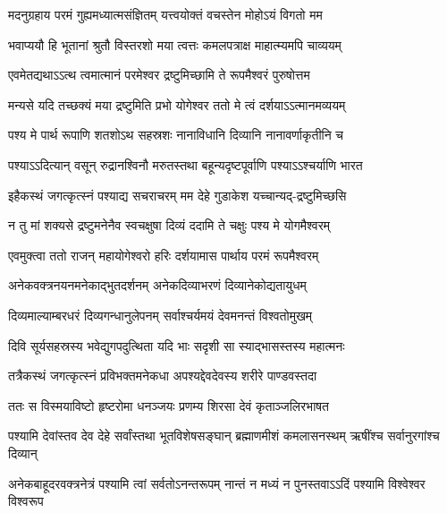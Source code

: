 \twolineshloka
{मदनुग्रहाय परमं गुह्यमध्यात्मसंज्ञितम्}
{यत्त्वयोक्तं वचस्तेन मोहोऽयं विगतो मम}%

\twolineshloka
{भवाप्ययौ हि भूतानां श्रुतौ विस्तरशो मया}
{त्वत्तः कमलपत्राक्ष माहात्म्यमपि चाव्ययम्}%

\twolineshloka
{एवमेतद्यथाऽऽत्थ त्वमात्मानं परमेश्वर}
{द्रष्टुमिच्छामि ते रूपमैश्वरं पुरुषोत्तम}%

\twolineshloka
{मन्यसे यदि तच्छक्यं मया द्रष्टुमिति प्रभो}
{योगेश्वर ततो मे त्वं दर्शयाऽऽत्मानमव्ययम्}%

\twolineshloka
{पश्य मे पार्थ रूपाणि शतशोऽथ सहस्रशः}
{नानाविधानि दिव्यानि नानावर्णाकृतीनि च}%

\twolineshloka
{पश्याऽऽदित्यान् वसून् रुद्रानश्विनौ मरुतस्तथा}
{बहून्यदृष्टपूर्वाणि पश्याऽऽश्चर्याणि भारत}%

\twolineshloka
{इहैकस्थं जगत्कृत्स्नं पश्याद्य सचराचरम्}
{मम देहे गुडाकेश यच्चान्यद्-द्रष्टुमिच्छसि}%

\twolineshloka
{न तु मां शक्यसे द्रष्टुमनेनैव स्वचक्षुषा}
{दिव्यं ददामि ते चक्षुः पश्य मे योगमैश्वरम्}%

\twolineshloka
{एवमुक्त्वा ततो राजन् महायोगेश्वरो हरिः}
{दर्शयामास पार्थाय परमं रूपमैश्वरम्}%

\twolineshloka
{अनेकवक्त्रनयनमनेकाद्भुतदर्शनम्}
{अनेकदिव्याभरणं दिव्यानेकोद्यतायुधम्}%

\twolineshloka
{दिव्यमाल्याम्बरधरं दिव्यगन्धानुलेपनम्}
{सर्वाश्चर्यमयं देवमनन्तं विश्वतोमुखम्}%

\twolineshloka
{दिवि सूर्यसहस्रस्य भवेद्युगपदुत्थिता}
{यदि भाः सदृशी सा स्याद्भासस्तस्य महात्मनः}%

\twolineshloka
{तत्रैकस्थं जगत्कृत्स्नं प्रविभक्तमनेकधा}
{अपश्यद्देवदेवस्य शरीरे पाण्डवस्तदा}%

\twolineshloka
{ततः स विस्मयाविष्टो हृष्टरोमा धनञ्जयः}
{प्रणम्य शिरसा देवं कृताञ्जलिरभाषत}%

\fourlineindentedshloka
{पश्यामि देवांस्तव देव देहे}
{सर्वांस्तथा भूतविशेषसङ्घान्}
{ब्रह्माणमीशं कमलासनस्थम्}
{ऋषींश्च सर्वानुरगांश्च दिव्यान्}%

\fourlineindentedshloka
{अनेकबाहूदरवक्त्रनेत्रं}
{पश्यामि त्वां सर्वतोऽनन्तरूपम्}
{नान्तं न मध्यं न पुनस्तवाऽऽदिं}
{पश्यामि विश्वेश्वर विश्वरूप}%

